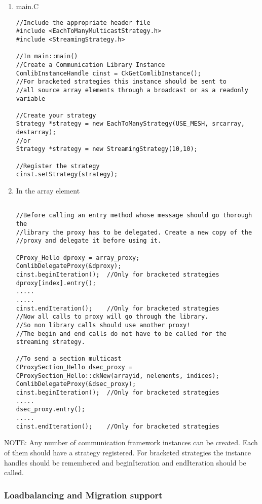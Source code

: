 \begin{enumerate}
\item main.C 
\begin{verbatim}
//Include the appropriate header file
#include <EachToManyMulticastStrategy.h>
#include <StreamingStrategy.h>

//In main::main() 
//Create a Communication Library Instance
ComlibInstanceHandle cinst = CkGetComlibInstance();
//For bracketed strategies this instance should be sent to 
//all source array elements through a broadcast or as a readonly variable

//Create your strategy
Strategy *strategy = new EachToManyStrategy(USE_MESH, srcarray, destarray);
//or
Strategy *strategy = new StreamingStrategy(10,10);

//Register the strategy
cinst.setStrategy(strategy);

\end{verbatim}

\item In the array element 
\begin{verbatim}

//Before calling an entry method whose message should go thorough the
//library the proxy has to be delegated. Create a new copy of the
//proxy and delegate it before using it.

CProxy_Hello dproxy = array_proxy;
ComlibDelegateProxy(&dproxy);
cinst.beginIteration();  //Only for bracketed strategies
dproxy[index].entry();   
.....
.....
cinst.endIteration();    //Only for bracketed strategies
//Now all calls to proxy will go through the library.
//So non library calls should use another proxy!
//The begin and end calls do not have to be called for the streaming strategy.

//To send a section multicast
CProxySection_Hello dsec_proxy = CProxySection_Hello::ckNew(arrayid, nelements, indices);
ComlibDelegateProxy(&dsec_proxy);
cinst.beginIteration();  //Only for bracketed strategies
.....
dsec_proxy.entry();
.....
cinst.endIteration();    //Only for bracketed strategies

\end{verbatim}
\end{enumerate}

NOTE: Any number of communication framework instances can be
created. Each of them should have a strategy registered. For bracketed
strategies the instance handles should be remembered and
beginIteration and endIteration should be called.


\subsubsection{Loadbalancing and Migration support}

